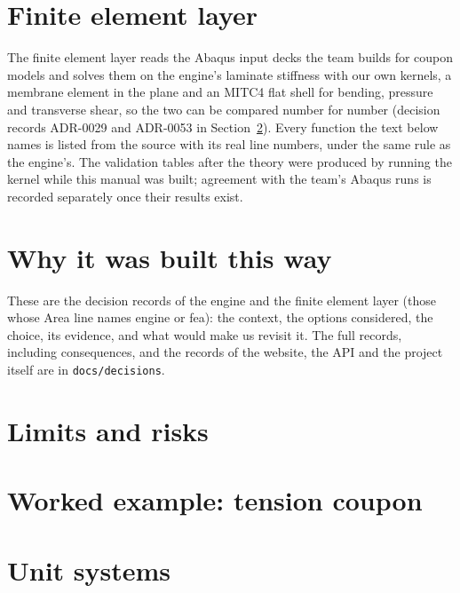 \documentclass[11pt,letterpaper]{article}
\begin{document}
\section{Finite element layer}\label{sec:fea}
The finite element layer reads the Abaqus input decks the team builds for coupon models and solves them on the
engine's laminate stiffness with our own kernels, a membrane element in the plane and an MITC4 flat shell for
bending, pressure and transverse shear, so the two can be compared number for number (decision records ADR-0029
and ADR-0053 in Section~\ref{sec:decisions}). Every function the text below names is listed from the source with
its real line numbers, under the same rule as the engine's. The validation tables after the theory were produced by running the kernel while this manual was built;
agreement with the team's Abaqus runs is recorded separately once their results exist.



\section{Why it was built this way}\label{sec:decisions}
These are the decision records of the engine and the finite element layer (those whose Area line names engine or
fea): the context, the options considered, the choice, its evidence, and what would make us revisit it. The full
records, including consequences, and the records of the website, the API and the project itself are in
\texttt{docs/decisions}.


\section{Limits and risks}\label{sec:limits}


\appendix

\section{Worked example: tension coupon}\label{sec:example}


\section{Unit systems}\label{sec:units}

\end{document}
